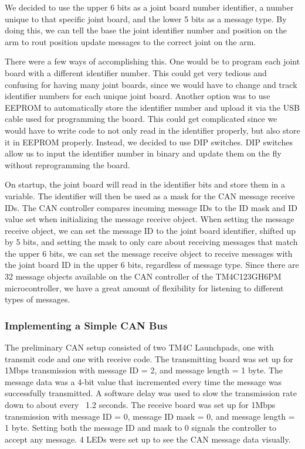 \noindent We decided to use the upper 6 bits as a joint board number identifier, a number unique to that specific joint board, and the lower 5 bits as a message type. By doing this, we can tell the base the joint identifier number and position on the arm to rout position update messages to the correct joint on the arm.

\noindent There were a few ways of accomplishing this. One would be to program each joint board with a different identifier number. This could get very tedious and confusing for having many joint boards, since we would have to change and track identifier numbers for each unique joint board. Another option was to use EEPROM to automatically store the identifier number and upload it via the USB cable used for programming the board. This could get complicated since we would have to write code to not only read in the identifier properly, but also store it in EEPROM properly. Instead, we decided to use DIP switches. DIP switches allow us to input the identifier number in binary and update them on the fly without reprogramming the board.

\noindent On startup, the joint board will read in the identifier bits and store them in a variable. The identifier will then be used as a mask for the CAN message receive IDs. The CAN controller compares incoming message IDs to the ID mask and ID value set when initializing the message receive object. When setting the message receive object, we can set the message ID to the joint board identifier, shifted up by 5 bits, and setting the mask to only care about receiving messages that match the upper 6 bits, we can set the message receive object to receive messages with the joint board ID in the upper 6 bits, regardless of message type. Since there are 32 message objects available on the CAN controller of the TM4C123GH6PM microcontroller, we have a great amount of flexibility for listening to different types of messages.

\subsubsection{Implementing a Simple CAN Bus}
The preliminary CAN setup consisted of two TM4C Launchpads, one with transmit code and one with receive code. The transmitting board was set up for 1Mbps transmission with message ID = 2, and message length = 1 byte. The message data was a 4-bit value that incremented every time the message was successfully transmitted. A software delay was used to slow the transmission rate down to about every ~1.2 seconds. The receive board was set up for 1Mbps transmission with message ID = 0, message ID mask = 0, and message length = 1 byte. Setting both the message ID and mask to 0 signals the controller to accept any message. 4 LEDs were set up to see the CAN message data visually.

